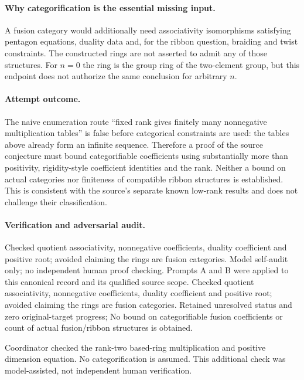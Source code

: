 \documentclass[11pt]{article}
\begin{document}
\paragraph{Why categorification is the essential missing input.} A fusion category would additionally need associativity isomorphisms satisfying pentagon equations, duality data and, for the ribbon question, braiding and twist constraints. The constructed rings are not asserted to admit any of those structures. For $n=0$ the ring is the group ring of the two-element group, but this endpoint does not authorize the same conclusion for arbitrary $n$.

\paragraph{Attempt outcome.} The naive enumeration route ``fixed rank gives finitely many nonnegative multiplication tables'' is false before categorical constraints are used: the tables above already form an infinite sequence. Therefore a proof of the source conjecture must bound categorifiable coefficients using substantially more than positivity, rigidity-style coefficient identities and the rank. Neither a bound on actual categories nor finiteness of compatible ribbon structures is established. This is consistent with the source's separate known low-rank results and does not challenge their classification.

\paragraph{Verification and adversarial audit.}
Checked quotient associativity, nonnegative coefficients, duality coefficient and positive root; avoided claiming the rings are fusion categories. Model self-audit only; no independent human proof checking. Prompts A and B were applied to this canonical record and its qualified source scope. Checked quotient associativity, nonnegative coefficients, duality coefficient and positive root; avoided claiming the rings are fusion categories. Retained unresolved status and zero original-target progress; No bound on categorifiable fusion coefficients or count of actual fusion/ribbon structures is obtained.

Coordinator checked the rank-two based-ring multiplication and positive dimension equation. No categorification is assumed. This additional check was model-assisted, not independent human verification.
\end{document}
